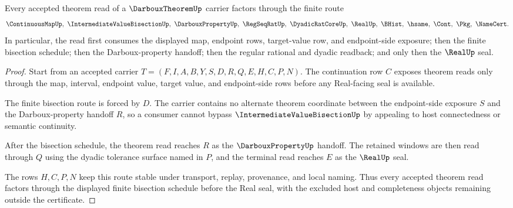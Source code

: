 \begin{theorem}
\label{thm:darboux-theorem-bisection-route}
Every accepted theorem read of a $\DarbouxTheoremUp$ carrier factors through the finite route
$$
\ContinuousMapUp,\ \IntermediateValueBisectionUp,\ \DarbouxPropertyUp,\ \RegSeqRatUp,\ \DyadicRatCoreUp,\ \RealUp,\ \BHist,\ \hsame,\ \Cont,\ \Pkg,\ \NameCert .
$$
In particular, the read first consumes the displayed map, endpoint rows, target-value row, and endpoint-side exposure; then the finite bisection schedule; then the Darboux-property handoff; then the regular rational and dyadic readback; and only then the $\RealUp$ seal.
\end{theorem}
\begin{proof}
Start from an accepted carrier $T=(F,I,A,B,Y,S,D,R,Q,E,H,C,P,N)$. The continuation row $C$ exposes theorem reads only through the map, interval, endpoint value, target value, and endpoint-side rows before any Real-facing seal is available.

The finite bisection route is forced by $D$. The carrier contains no alternate theorem coordinate between the endpoint-side exposure $S$ and the Darboux-property handoff $R$, so a consumer cannot bypass $\IntermediateValueBisectionUp$ by appealing to host connectedness or semantic continuity.

After the bisection schedule, the theorem read reaches $R$ as the $\DarbouxPropertyUp$ handoff. The retained windows are then read through $Q$ using the dyadic tolerance surface named in $P$, and the terminal read reaches $E$ as the $\RealUp$ seal.

The rows $H,C,P,N$ keep this route stable under transport, replay, provenance, and local naming. Thus every accepted theorem read factors through the displayed finite bisection schedule before the Real seal, with the excluded host and completeness objects remaining outside the certificate.
\end{proof}


